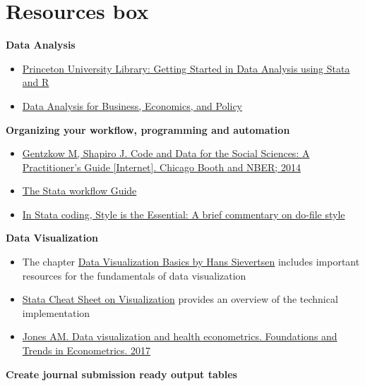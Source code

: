 \documentclass[
]{book}
\providecommand{\tightlist}{%
  \setlength{\itemsep}{0pt}\setlength{\parskip}{0pt}}
\begin{document}
\hypertarget{resources-box-4}{%
\section{Resources box}\label{resources-box-4}}

\textbf{Data Analysis}

\begin{itemize}
\tightlist
\item
  \href{https://dss.princeton.edu/training/}{Princeton University
  Library: Getting Started in Data Analysis using Stata and R}
\item
  \href{https://gabors-data-analysis.com/}{Data Analysis for Business,
  Economics, and Policy}
\end{itemize}

\textbf{Organizing your workflow, programming and automation}

\begin{itemize}
\tightlist
\item
  \href{https://web.stanford.edu/~gentzkow/research/CodeAndData.pdf}{Gentzkow
  M, Shapiro J. Code and Data for the Social Sciences: A Practitioner's
  Guide {[}Internet{]}. Chicago Booth and NBER; 2014}
\item
  \href{https://medium.com/the-stata-guide/the-stata-workflow-guide-52418ce35006}{The
  Stata workflow Guide}
\item
  \href{https://michaelshill.net/2015/07/31/in-stata-coding-style-is-the-essential/}{In
  Stata coding, Style is the Essential: A brief commentary on do-file
  style}
\end{itemize}

\textbf{Data Visualization}

\begin{itemize}
\tightlist
\item
  The chapter
  \href{https://hhsievertsen.github.io/EconDataBook/data-visualization-basics.html}{Data
  Visualization Basics by Hans Sievertsen} includes important resources
  for the fundamentals of data visualization
\item
  \href{https://www.stata.com/bookstore/stata-cheat-sheets/}{Stata Cheat
  Sheet on Visualization} provides an overview of the technical
  implementation
\item
  \href{https://doi.org/10.1561/0800000033}{Jones AM. Data visualization
  and health econometrics. Foundations and Trends in Econometrics. 2017}
\end{itemize}

\textbf{Create journal submission ready output tables}
\end{document}
